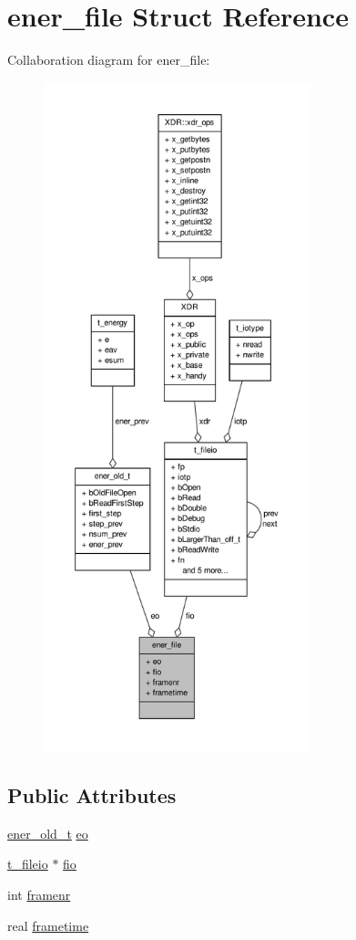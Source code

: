 \hypertarget{structener__file}{\section{ener\-\_\-file \-Struct \-Reference}
\label{structener__file}
}


\-Collaboration diagram for ener\-\_\-file\-:
\nopagebreak
\begin{figure}[H]
\begin{center}
\leavevmode
\includegraphics[height=550pt]{structener__file__coll__graph}
\end{center}
\end{figure}
\subsection*{\-Public \-Attributes}
\begin{DoxyCompactItemize}
\item 
\hyperlink{structener__old__t}{ener\-\_\-old\-\_\-t} \hyperlink{structener__file_a08eb6b1ad9c5e776d78050a6e5ff5e26}{eo}
\item 
\hyperlink{structt__fileio}{t\-\_\-fileio} $\ast$ \hyperlink{structener__file_ad86392bac9dc78c6adaae65a967bcd9f}{fio}
\item 
int \hyperlink{structener__file_a1bb3f5202def84cf2be9a2790622a2b0}{framenr}
\item 
real \hyperlink{structener__file_a22a2b7e31ce256db50317203e6634c81}{frametime}
\end{DoxyCompactItemize}



